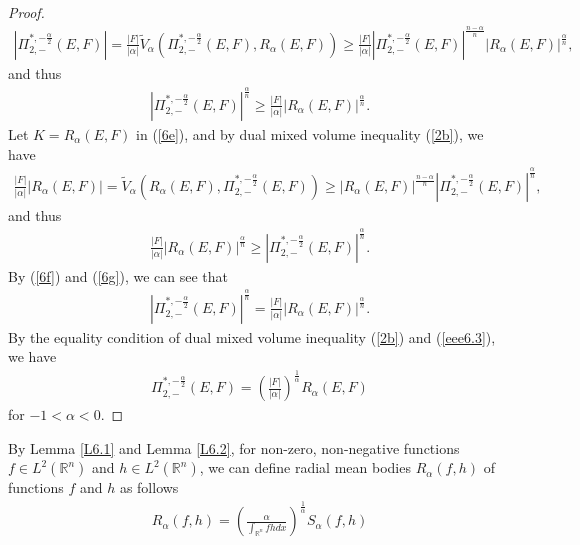\documentclass[preprint,12pt]{elsarticle}
\begin{document}
\begin{proof}
\begin{eqnarray*}
|{\Pi }_{2,-}^{*,-\frac{\alpha }{2} }(E,F)|=\frac{|F|}{|\alpha| }\widetilde{V}_{\alpha} ({\Pi }_{2,-}^{*,-\frac{\alpha }{2} }(E,F),{R}_{\alpha }(E,F))\geq  \frac{|F|}{|\alpha |}|{\Pi }_{2,-}^{*,-\frac{\alpha }{2} }(E,F)|^{\frac{n-\alpha}{n}}|{R}_{\alpha }(E,F)|^{\frac{\alpha}{n}}, 
\end{eqnarray*} 
and thus
\begin{eqnarray}\label{6f}
|{\Pi }_{2,-}^{*,-\frac{\alpha }{2} }(E,F)|^{\frac{\alpha}{n}}\geq \frac{|F|}{|\alpha |}|{R}_{\alpha }(E,F)|^{\frac{\alpha}{n}}.
\end{eqnarray} 
Let $K={R}_{\alpha }(E,F) $ in (\ref{6e}), and by dual mixed volume inequality (\ref{2b}), we have
\begin{eqnarray*}
\frac{|F|}{|\alpha| }|{R}_{\alpha }(E,F)|=\widetilde{V}_{\alpha} ({R}_{\alpha }(E,F),{\Pi }_{2,-}^{*,-\frac{\alpha }{2} }(E,F))\geq |{R}_{\alpha }(E,F)|^{\frac{n-\alpha}{n}}|{\Pi }_{2,-}^{*,-\frac{\alpha }{2} }(E,F)|^{\frac{\alpha}{n}},
\end{eqnarray*} 
and thus
\begin{eqnarray}\label{6g}
\frac{|F|}{|\alpha| }|{R}_{\alpha }(E,F)|^{\frac{\alpha}{n}} \geq |{\Pi }_{2,-}^{*,-\frac{\alpha }{2} }(E,F)|^{\frac{\alpha}{n}}.
\end{eqnarray} 
By (\ref{6f}) and (\ref{6g}), we can see that
\begin{eqnarray}\label{eee6.3}
|{\Pi }_{2,-}^{*,-\frac{\alpha }{2} }(E,F)|^{\frac{\alpha}{n}}=\frac{|F|}{|\alpha| }|{R}_{\alpha }(E,F)|^{\frac{\alpha}{n}}.
\end{eqnarray}
By the equality condition of dual mixed volume inequality (\ref{2b}) and (\ref{eee6.3}), we have
\begin{eqnarray}\label{6h}
{\Pi }_{2,-}^{*,-\frac{\alpha }{2} }(E,F)=\left(\frac{|F|}{|\alpha| }\right)^{\frac{1}{\alpha}}{R}_{\alpha }(E,F)
\end{eqnarray} 
for $-1<\alpha <0$.
\end{proof}
By Lemma \ref{L6.1} and Lemma \ref{L6.2}, for non-zero, non-negative functions $f\in {L}^{2} (\mathbb{R}^n)$ and $h\in {L}^{2} (\mathbb{R}^n)$, we can define radial mean bodies ${R}_{\alpha }(f,h)$ of functions $f$ and $h$ as follows
\begin{eqnarray}\label{7a}
	{R}_{\alpha }(f,h)=\left(\frac{\alpha}{\int_{\mathbb{R}^n} fhdx}\right)^{\frac{1}{\alpha}}{S}_{\alpha }(f,h)
\end{eqnarray}
\end{document}
